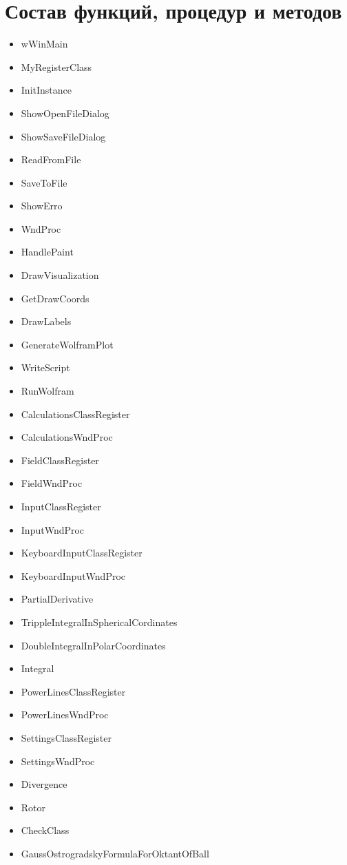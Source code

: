 \documentclass[14pt,a4paper,final]{extreport}
\begin{document}
\section{ Состав функций, процедур и методов}
\begin{itemize}
	\item  wWinMain
	\item  MyRegisterClass
	\item  InitInstance
	\item  ShowOpenFileDialog
	\item  ShowSaveFileDialog
	\item  ReadFromFile
	\item  SaveToFile
	\item  ShowErro
	\item  WndProc
	\item  HandlePaint
	\item  DrawVisualization
	\item  GetDrawCoords
	\item  DrawLabels
	\item  GenerateWolframPlot
	\item  WriteScript
	\item  RunWolfram
	\item  CalculationsClassRegister
	\item  CalculationsWndProc
	\item  FieldClassRegister
	\item  FieldWndProc
	\item  InputClassRegister
	\item  InputWndProc
	\item  KeyboardInputClassRegister
	\item  KeyboardInputWndProc
	\item  PartialDerivative
	\item  TrippleIntegralInSphericalCordinates
	\item  DoubleIntegralInPolarCoordinates
	\item  Integral
	\item  PowerLinesClassRegister
	\item  PowerLinesWndProc
	\item  SettingsClassRegister
	\item  SettingsWndProc
	\item  Divergence
	\item  Rotor
	\item  CheckClass
	\item  GaussOstrogradskyFormulaForOktantOfBall

\end{itemize}
\end{document}
